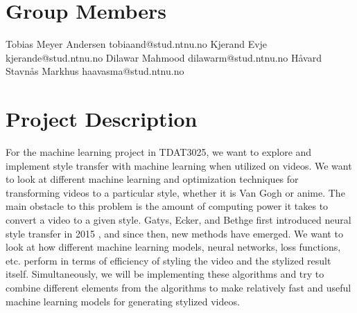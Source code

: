 \section{Group Members}
\begin{outline}
\1 Tobias Meyer Andersen
\2 tobiaand@stud.ntnu.no
\1 Kjerand Evje
\2 kjerande@stud.ntnu.no
\1 Dilawar Mahmood
\2 dilawarm@stud.ntnu.no
\1 Håvard Stavnås Markhus
\2 haavasma@stud.ntnu.no
\end{outline}
\section{Project Description}
For the machine learning project in TDAT3025, we want to explore and implement style transfer with machine learning when utilized on videos. We want to look at different machine learning and optimization techniques for transforming videos to a particular style, whether it is Van Gogh or anime.\newline\newline
The main obstacle to this problem is the amount of computing power it takes to convert a video to a given style. Gatys, Ecker, and Bethge first introduced neural style transfer in 2015 \cite{Gatys:1}, and since then, new methods have emerged. We want to look at how different machine learning models, neural networks, loss functions, etc. perform in terms of efficiency of styling the video and the stylized result itself. Simultaneously, we will be implementing these algorithms and try to combine different elements from the algorithms to make relatively fast and useful machine learning models for generating stylized videos.